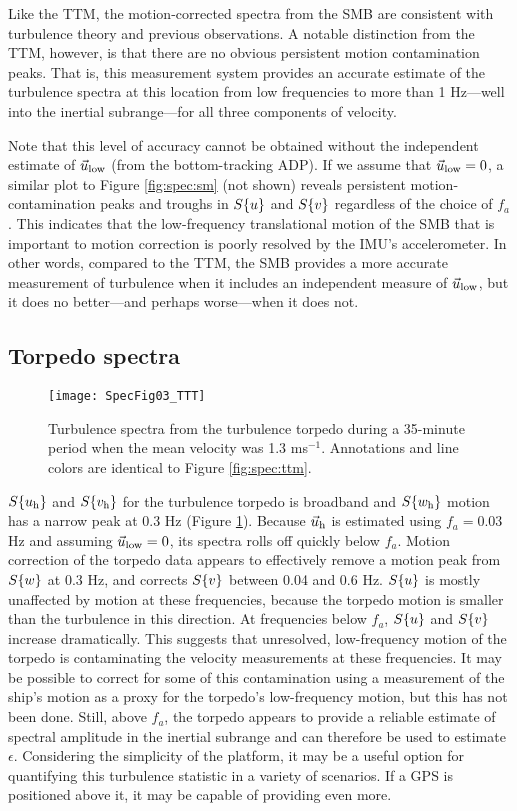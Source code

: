 Like the TTM, the motion-corrected spectra from the SMB are consistent with turbulence theory and previous observations. A notable distinction from the TTM, however, is that there are no obvious persistent motion contamination peaks. That is, this measurement system provides an accurate estimate of the turbulence spectra at this location from low frequencies to more than 1 Hz---well into the inertial subrange---for all three components of velocity.

Note that this level of accuracy cannot be obtained without the independent estimate of $\vec{u}_\mathrm{low}$ (from the bottom-tracking ADP). If we assume that $\vec{u}_\mathrm{low}=0$, a similar plot to Figure \ref{fig:spec:sm} (not shown) reveals persistent motion-contamination peaks and troughs in $S\{u\}$ and $S\{v\}$ regardless of the choice of $f_a$. This indicates that the low-frequency translational motion of the SMB that is important to motion correction is poorly resolved by the IMU's accelerometer. In other words, compared to the TTM, the SMB provides a more accurate measurement of turbulence when it includes an independent measure of $\vec{u}_\mathrm{low}$, but it does no better---and perhaps worse---when it does not.

\subsection{Torpedo spectra}

\begin{figure}[t]
  \centering
  \texttt{[image: SpecFig03\_TTT]}
  \caption{Turbulence spectra from the turbulence torpedo during a 35-minute period when the mean velocity was 1.3 ms$^{-1}$. Annotations and line colors are identical to Figure \ref{fig:spec:ttm}.}
  \label{fig:spec:torpedo}
\end{figure}

$S\{u_{\mathrm{h}}\}$ and $S\{v_{\mathrm{h}}\}$ for the turbulence torpedo is broadband and $S\{w_{\mathrm{h}}\}$ motion has a narrow peak at 0.3 Hz (Figure \ref{fig:spec:torpedo}). Because $\vec{u}_{\mathrm{h}}$ is estimated using $f_a = 0.03$ Hz and assuming $\vec{u}_\mathrm{low}=0$, its spectra rolls off quickly below $f_a$.  Motion correction of the torpedo data appears to effectively remove a motion peak from $S\{w\}$ at 0.3 Hz, and corrects $S\{v\}$ between 0.04 and 0.6 Hz. $S\{u\}$ is mostly unaffected by motion at these frequencies, because the torpedo motion is smaller than the turbulence in this direction. At frequencies below $f_a$, $S\{u\}$ and $S\{v\}$ increase dramatically. This suggests that unresolved, low-frequency motion of the torpedo is contaminating the velocity measurements at these frequencies. It may be possible to correct for some of this contamination using a measurement of the ship's motion as a proxy for the torpedo's low-frequency motion, but this has not been done. Still, above $f_a$, the torpedo appears to provide a reliable estimate of spectral amplitude in the inertial subrange and can therefore be used to estimate $\epsilon$. Considering the simplicity of the platform, it may be a useful option for quantifying this turbulence statistic in a variety of scenarios. If a GPS is positioned above it, it may be capable of providing even more.


